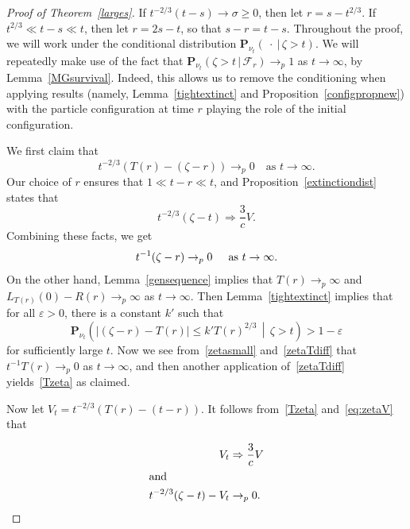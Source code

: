 \documentclass[10pt]{amsart}
\theoremstyle{definition}\newtheorem{defi}[theo]{Definition}\newtheorem{rema}[theo]{Remark}\newtheorem{exam}[theo]{Example}\newtheorem{exem}[theo]{Example}\newtheorem{nota}[theo]{Notation}
\newcommand*\eps{\varepsilon}
\renewcommand*\P{\mathbf{P}}
\newcommand\F{\mathcal{F}}
\newcommand{\1} {\mathds{1}}
\renewcommand*\to{\rightarrow}
\begin{document}
\begin{proof}[Proof of Theorem~\ref{larges}]
If $t^{-2/3}(t - s) \to \sigma \geq 0$, then let $r = s - t^{2/3}$. If $t^{2/3} \ll t - s \ll t$, then let $r = 2s - t$, so that $s - r = t - s$. Throughout the proof, we will work under the conditional distribution $\P_{\nu_t}(\: \cdot \:|\, \zeta > t)$. We will repeatedly make use of the fact that $\P_{\nu_t}(\zeta > t\,|\,\F_r) \rightarrow_p 1$ as $t \rightarrow \infty$, by Lemma~\ref{MGsurvival}. Indeed, this allows us to remove the conditioning when applying results (namely, Lemma~\ref{tightextinct} and Proposition~\ref{configpropnew}) with the particle configuration at time $r$ playing the role of the initial configuration.

We first claim that
\begin{equation}\label{Tzeta}
t^{-2/3}\left(T(r) - (\zeta - r)\right) \rightarrow_p 0 \quad\text{as }t \rightarrow \infty.
\end{equation}
Our choice of $r$ ensures that $1 \ll t - r \ll t$, and Proposition~\ref{extinctiondist} states that
\begin{equation}\label{eq:zetaV}
t^{-2/3}(\zeta - t) \Rightarrow \frac{3}{c}V.
\end{equation}
Combining these facts, we get
\begin{equation}\label{zetasmall}
t^{-1}(\zeta - r) \rightarrow_p 0 \hspace{.2in}\mbox{as }t \rightarrow \infty.
\end{equation}
On the other hand, Lemma~\ref{gensequence} implies that $T(r) \rightarrow_p \infty$ and $L_{T(r)}(0) - R(r) \rightarrow_p \infty$ as $t \rightarrow \infty$. Then Lemma~\ref{tightextinct} implies that for all $\eps > 0$, there is a constant $k'$ such that
\begin{equation}\label{zetaTdiff}
\P_{\nu_t}\left(\left|(\zeta - r) - T(r)\right| \leq k' T(r)^{2/3} \,\middle|\, \zeta > t\right) > 1 - \eps
\end{equation}
for sufficiently large $t$. Now we see from~\eqref{zetasmall} and~\eqref{zetaTdiff} that $t^{-1}T(r) \rightarrow_p 0$ as $t \rightarrow \infty$, and then another application of~\eqref{zetaTdiff} yields~\eqref{Tzeta} as claimed.

Now let $V_t = t^{-2/3}(T(r) - (t - r))$. It follows from~\eqref{Tzeta} and~\eqref{eq:zetaV} that

\begin{align}
V_t &\Rightarrow \frac{3}{c} V\label{Tudist}
\\
\intertext{and}
t^{-2/3}(\zeta - t) - V_t &\rightarrow_p 0.\label{simcon1}
\end{align}


\end{proof}
\end{document}
